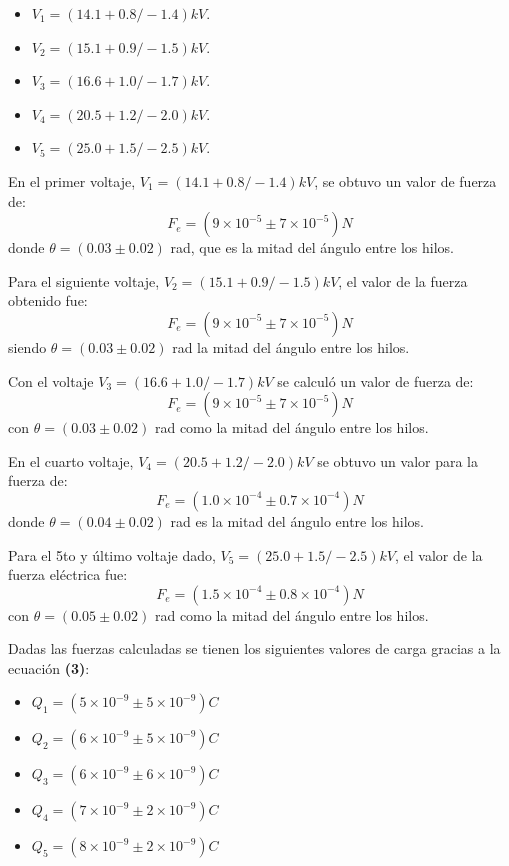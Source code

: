 \documentclass[letterpaper, 11 pt]{article}
\begin{document}
\begin{multicols*}{2}
\begin{itemize}
    \item $V_1=(14.1 +0.8/-1.4) kV$.
    \item $V_2=(15.1 +0.9/-1.5) kV$.
    \item $V_3=(16.6 +1.0/-1.7) kV$.
    \item $V_4=(20.5 +1.2/-2.0) kV$.
    \item $V_5=(25.0 +1.5/-2.5) kV$.
\end{itemize}

En el primer voltaje, $V_1=(14.1 +0.8/-1.4) kV$, se obtuvo un valor de fuerza de:
\begin{equation*}
    F_e= ( 9\times 10 ^{-5} \pm  7\times 10 ^{-5})N  
\end{equation*} 
donde $ \theta =( 0.03 \pm 0.02) $ rad, que es la mitad del ángulo entre los hilos.

Para el siguiente voltaje,  $V_2=(15.1 +0.9/-1.5) kV$, el valor de la fuerza obtenido fue:
\begin{equation*}
    F_e= ( 9\times 10 ^{-5} \pm  7\times 10 ^{-5})N  
\end{equation*} 
siendo $ \theta =( 0.03 \pm 0.02) $ rad   la mitad del ángulo entre los hilos.

Con el voltaje  $V_3=(16.6 +1.0/-1.7) kV$ se calculó un valor de fuerza de:
\begin{equation*}
    F_e= ( 9\times 10 ^{-5} \pm  7\times 10 ^{-5})N  
\end{equation*} 
con $ \theta =( 0.03 \pm 0.02) $ rad  como  la mitad del ángulo entre los hilos.

En el cuarto voltaje, $V_4=(20.5 +1.2/-2.0) kV$ se obtuvo un valor para la fuerza de:
\begin{equation*}
    F_e= ( 1.0\times 10 ^{-4} \pm  0.7\times 10 ^{-4})N  
\end{equation*} 
donde $ \theta =( 0.04 \pm 0.02) $ rad  es la mitad del ángulo entre los hilos.

Para el 5to y último voltaje dado,  $V_5=(25.0 +1.5/-2.5) kV$,  el valor de la fuerza eléctrica fue:
\begin{equation*}
    F_e= ( 1.5\times 10 ^{-4} \pm  0.8\times 10 ^{-4})N  
\end{equation*} 
con  $ \theta =( 0.05 \pm 0.02) $ rad  como  la mitad del ángulo entre los hilos.

Dadas las fuerzas calculadas se tienen los siguientes valores de carga gracias a la ecuación \textbf{(3)}:

\begin{itemize}
\item  $Q_1 =( 5\times 10^{-9} \pm 5\times 10^{-9}) C$
\item  $Q_2 =( 6\times 10^{-9} \pm 5\times 10^{-9}) C$
\item  $Q_3 =( 6\times 10^{-9} \pm 6\times 10^{-9}) C$
\item  $Q_4 =( 7\times 10^{-9} \pm 2\times 10^{-9}) C$
\item  $Q_5 =( 8\times 10^{-9} \pm 2\times 10^{-9}) C$
\end{itemize}


\end{multicols*}
\end{document}

